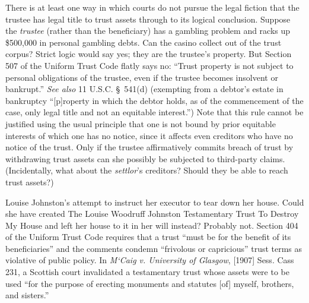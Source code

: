 
\item There is at least one way in which courts do not pursue the legal fiction
that the trustee has legal title to trust assets through to its logical
conclusion. Suppose the \textit{trustee} (rather than the beneficiary) has a
gambling problem and racks up \$500,000 in personal gambling debts. Can the
casino collect out of the trust corpus? Strict logic would say yes; they are the
trustee's property. But Section 507 of the Uniform Trust Code flatly says no:
``Trust property is not subject to personal obligations of the trustee, even if
the trustee becomes insolvent or bankrupt.'' \textit{See also} 11 U.S.C.
\S~541(d) (exempting from a debtor's estate in bankruptcy ``[p]roperty in which
the debtor holds, as of the commencement of the case, only legal title and not
an equitable interest.'') Note that this rule cannot be justified using the
usual principle that one is not bound by prior equitable interests of which one
has no notice, since it affects even creditors who have no notice of the trust.
Only if the trustee affirmatively commits breach of trust by withdrawing trust
assets can she possibly be subjected to third-party claims. (Incidentally, what
about the \textit{settlor}'s creditors? Should they be able to reach trust
assets?)

\item
{} Louise
Johnston's attempt to instruct her executor to tear down her house. Could she
have created The Louise Woodruff Johnston Testamentary Trust To Destroy My House
and left her house to it in her will instead? Probably not. Section 404 of the
Uniform Trust Code requires that a trust ``must be for the benefit of its
beneficiaries'' and the comments condemn ``frivolous or capricious'' trust terms
as violative of public policy. In \textit{M`Caig v. University of Glasgow},
[1907] Sess. Cass 231, a Scottish court invalidated a testamentary trust whose
assets were to be used ``for the purpose of erecting monuments and statutes [of]
myself, brothers, and sisters.''
